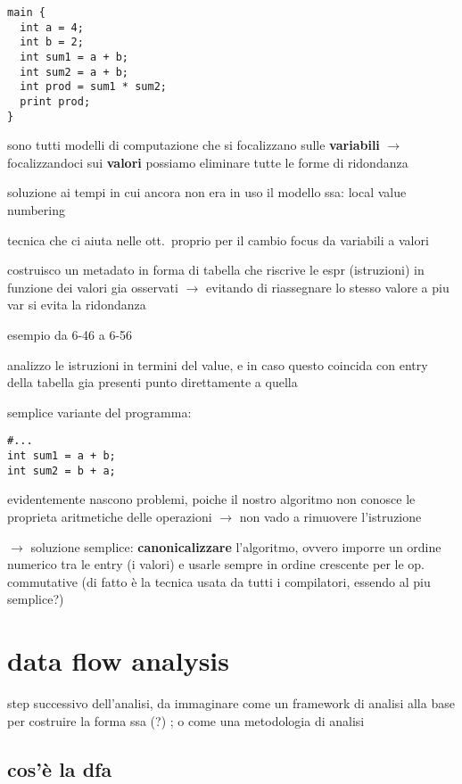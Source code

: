 \begin{lstlisting}
main {
  int a = 4;
  int b = 2;
  int sum1 = a + b;
  int sum2 = a + b;
  int prod = sum1 * sum2;
  print prod;
}\end{lstlisting}

sono tutti modelli di computazione che si focalizzano sulle \textbf{variabili} $\rightarrow$ focalizzandoci sui \textbf{valori} possiamo eliminare tutte le forme di ridondanza

soluzione ai tempi in cui ancora non era in uso il modello ssa: local value numbering

tecnica che ci aiuta nelle ott.~proprio per il cambio focus da variabili a valori

costruisco un metadato in forma di tabella che riscrive le espr (istruzioni) in funzione dei valori gia osservati $\rightarrow$ evitando di riassegnare lo stesso valore a piu var si evita la ridondanza

esempio da 6-46 a 6-56

analizzo le istruzioni in termini del value, e in caso questo coincida con entry della tabella gia presenti punto direttamente a quella

semplice variante del programma:
\begin{lstlisting}
#...
int sum1 = a + b;
int sum2 = b + a;\end{lstlisting}

evidentemente nascono problemi, poiche il nostro algoritmo non conosce le proprieta aritmetiche delle operazioni $\rightarrow$ non vado a rimuovere l'istruzione

$\rightarrow$ soluzione semplice: \textbf{canonicalizzare} l'algoritmo, ovvero imporre un ordine numerico tra le entry (i valori) e usarle sempre in ordine crescente per le op. commutative (di fatto \`e la tecnica usata da tutti i compilatori, essendo al piu semplice?)

\section{data flow analysis}

step successivo dell'analisi, da immaginare come un framework di analisi alla base per costruire la forma ssa (?) ; o come una metodologia di analisi

\subsection{cos'\`e la dfa}

